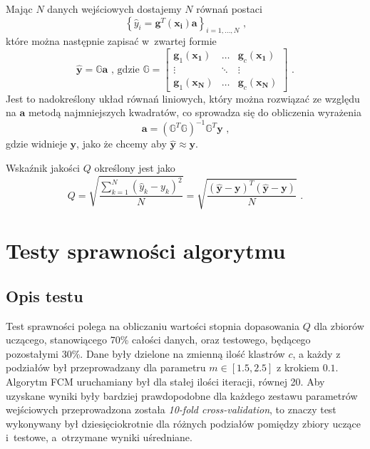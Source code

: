 \documentclass[a4paper; 11pt]{article}
\begin{document}
Mając $N$ danych wejściowych dostajemy $N$ równań postaci
\begin{equation}
    \left\{ \hat{y}_i = \mathbf{g}^T(\mathbf{x_i}) \mathbf{a} \right\} _ {i = 1, \dots , N} \text{ ,}
    \label{eq:ts:yhateqs}
\end{equation}
które można następnie zapisać w~zwartej formie
\begin{equation}
    \hat{\mathbf{y}} = \mathbb{G} \mathbf{a} \text{ , gdzie }
    \mathbb{G} = \begin{bmatrix}
        \mathbf{g}_1(\mathbf{x_1}) & \dots & \mathbf{g}_c(\mathbf{x_1}) \\
        \vdots & \ddots & \vdots \\
        \mathbf{g}_1(\mathbf{x_N}) & \dots & \mathbf{g}_c(\mathbf{x_N})
    \end{bmatrix} \text{ .}
    \label{eq:ts:yhatmatrix}
\end{equation}
Jest to nadokreślony układ równań liniowych, który można rozwiązać ze względu
na $\mathbf{a}$ metodą najmniejszych kwadratów, co sprowadza się do obliczenia
wyrażenia
\begin{equation}
    \mathbf{a} = \left( \mathbb{G}^T \mathbb{G} \right)^{-1} \mathbb{G}^T \mathbf{y} \text{ ,}
    \label{eq:ts:a}
\end{equation}
gdzie widnieje $\mathbf{y}$, jako że chcemy aby $\hat{\mathbf{y}} \approx \mathbf{y}$.

Wskaźnik jakości $Q$ określony jest jako
\begin{equation}
    Q = \sqrt{ \frac{ \sum\limits_{k=1}^N {\left( \hat{y}_k - y_k \right)^2} }{N} }
    = \sqrt { \frac{ (\hat{\mathbf{y}} - \mathbf{y})^T (\hat{\mathbf{y}} - \mathbf{y}) }{N} } \text{ .}
    \label{eq:ts:Q}
\end{equation}

\section{Testy sprawności algorytmu}

\subsection{Opis testu}
Test sprawności polega na obliczaniu wartości stopnia dopasowania $Q$ dla zbiorów uczącego,
stanowiącego 70\% całości danych, oraz testowego, będącego pozostałymi 30\%.
Dane były dzielone na zmienną ilość klastrów $c$, a każdy z podziałów
był przeprowadzany dla parametru $m \in [1.5, 2.5]$ z krokiem $0.1$.
Algorytm FCM uruchamiany był dla stałej ilości iteracji, równej 20.
Aby uzyskane wyniki były bardziej prawdopodobne dla każdego zestawu parametrów
wejściowych przeprowadzona została \emph{10-fold cross-validation}, to znaczy
test wykonywany był dziesięciokrotnie dla różnych podziałów pomiędzy zbiory
uczące i~testowe, a~otrzymane wyniki uśredniane.
\end{document}
